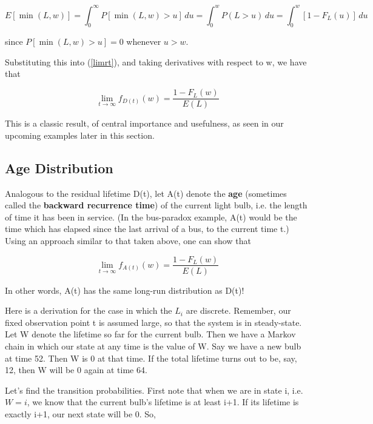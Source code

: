 \begin{equation}
E[\min(L,w)]=\int ^{\infty }_{0}P[\min(L,w)>u]\, du=\int ^{w}_{0}P(L>u)\,
du=\int ^{w}_{0}[1-F_{L}(u)]\, du
\end{equation}

since $P[\min(L,w) > u] = 0$ whenever $u > w$.

Substituting this into (\ref{limrt}), and taking derivatives with
respect to w, we have that 

\begin{equation}
\label{resid}
\lim_{t\rightarrow \infty }f_{D(t)}(w)=\frac{1-F_{L}(w)}{E(L)}
\end{equation}

This is a classic result, of central importance and usefulness, as seen
in our upcoming examples later in this section.

\subsection{Age Distribution}
\label{agedistribution}

Analogous to the residual lifetime D(t), let A(t) denote the
\textbf{age} (sometimes called the \textbf{backward recurrence time}) of
the current light bulb, i.e.  the length of time it has been in service.
(In the bus-paradox example, A(t) would be the time which has elapsed
since the last arrival of a bus, to the current time t.) Using an
approach similar to that taken above, one can show that

\begin{equation}
\label{age}
\lim_{t\rightarrow \infty }f_{A(t)}(w)=\frac{1-F_{L}(w)}{E(L)}
\end{equation}

In other words, A(t) has the same long-run distribution as D(t)!

Here is a derivation for the case in which the $L_i$ are discrete.
Remember, our fixed observation point t is assumed large, so that the
system is in steady-state.  Let W denote the lifetime so far for the
current bulb.  Then we have a Markov chain in which our state at any
time is the value of W.  Say we have a new bulb at time 52.  Then W is 0
at that time.  If the total lifetime turns out to be, say, 12, then W
will be 0 again at time 64.  

Let's find the transition probabilities.  First note that when we are in
state i, i.e. $W = i$, we know that the current bulb's lifetime is at
least i+1.  If its lifetime is exactly i+1, our next state will be 0.
So,

